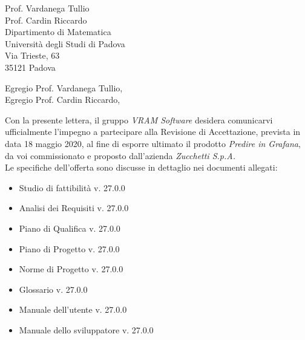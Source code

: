 \documentclass[a4paper,12pt]{letteracdp}
\date{14 maggio 2020}
\begin{document}
\begin{letter}{
		Prof. Vardanega Tullio \\
		Prof. Cardin Riccardo \\
		Dipartimento di Matematica \\
		Università degli Studi di Padova \\
		Via Trieste, 63 \\
		35121 Padova}
	
	\opening{Egregio Prof. Vardanega Tullio, \\ \noindent Egregio Prof. Cardin Riccardo,}
	
	\begin{flushleft}
	Con la presente lettera, il gruppo \textit{VRAM Software} desidera comunicarvi ufficialmente l'impegno a partecipare alla Revisione di Accettazione, prevista in data 18 maggio 2020, al fine di esporre ultimato il prodotto \textit{Predire in Grafana}, da voi commissionato e proposto dall'azienda \textit{Zucchetti S.p.A.} \\
	Le specifiche dell'offerta sono discusse in dettaglio nei documenti allegati: \\ 
	\end{flushleft}

	\begin{itemize}
		\item Studio di fattibilità v. 27.0.0
		\item Analisi dei Requisiti v. 27.0.0
		\item Piano di Qualifica v. 27.0.0
		\item Piano di Progetto v. 27.0.0
		\item Norme di Progetto v. 27.0.0
		\item Glossario v. 27.0.0
		
		\item Manuale dell'utente v. 27.0.0
		\item Manuale dello sviluppatore v. 27.0.0
		

\end{itemize}
\end{letter}
\end{document}
